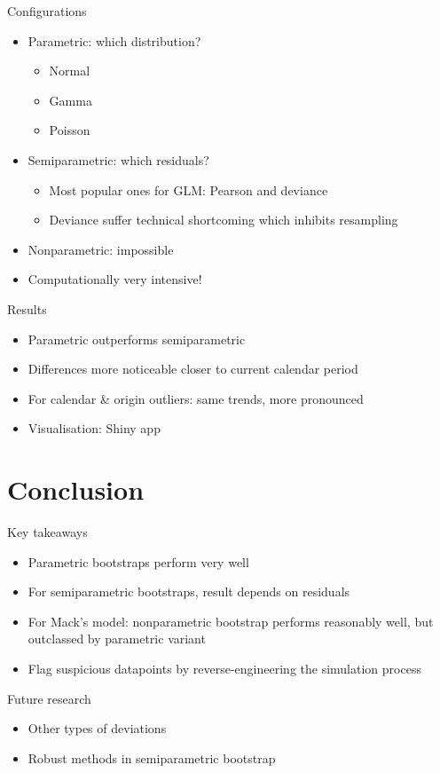 \documentclass[tikz]{beamer}
\begin{document}
\begin{frame}{Configurations}
  \begin{itemize}
    \item Parametric: which distribution?
          \begin{itemize}
            \item Normal
            \item Gamma
            \item Poisson
          \end{itemize}
    \item Semiparametric: which residuals?
          \begin{itemize}
            \item Most popular ones for GLM: Pearson and deviance
            \item Deviance suffer technical shortcoming which inhibits resampling
          \end{itemize}
    \item Nonparametric: impossible
    \item Computationally very intensive!
  \end{itemize}
\end{frame}


\begin{frame}{Results}
  \begin{itemize}
    \item Parametric outperforms semiparametric
    \item Differences more noticeable closer to current calendar period
    \item For calendar \& origin outliers: same trends, more pronounced
    \item Visualisation: Shiny app
  \end{itemize}
\end{frame}

\section{Conclusion}

\begin{frame}{Key takeaways}
  \begin{itemize}
    \item Parametric bootstraps perform very well
    \item For semiparametric bootstraps, result depends on residuals
    \item For Mack's model: nonparametric bootstrap performs reasonably well, but outclassed by parametric variant
    \item Flag suspicious datapoints by reverse-engineering the simulation process
  \end{itemize}
\end{frame}

\begin{frame}{Future research}
  \begin{itemize}
    \item Other types of deviations
    \item Robust methods in semiparametric bootstrap
  \end{itemize}
\end{frame}
\end{document}
